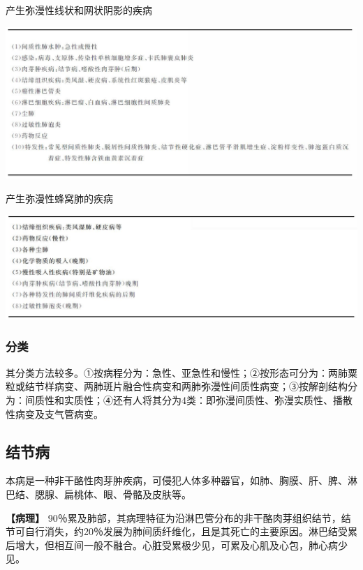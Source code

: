 \begin{table}[htbp]
\centering
\caption{产生弥漫性线状和网状阴影的疾病}
\label{tab9-10}
\includegraphics[width=\textwidth,height=\textheight,keepaspectratio]{./images/Image00233.jpg}
\end{table}

\begin{table}[htbp]
\centering
\caption{产生弥漫性蜂窝肺的疾病}
\label{tab9-11}
\includegraphics[width=\textwidth,height=\textheight,keepaspectratio]{./images/Image00234.jpg}
\end{table}

\subsubsection{分类}

其分类方法较多。①按病程分为：急性、亚急性和慢性；②按形态可分为：两肺粟粒或结节样病变、两肺斑片融合性病变和两肺弥漫性间质性病变；③按解剖结构分为：间质性和实质性；④还有人将其分为4类：即弥漫间质性、弥漫实质性、播散性病变及支气管病变。

\subsection{结节病}

本病是一种非干酪性肉芽肿疾病，可侵犯人体多种器官，如肺、胸膜、肝、脾、淋巴结、腮腺、扁桃体、眼、骨骼及皮肤等。

\textbf{【病理】}
90％累及肺部，其病理特征为沿淋巴管分布的非干酪肉芽组织结节，结节可自行消失，约20％发展为肺间质纤维化，且是其死亡的主要原因。淋巴结受累后增大，但相互间一般不融合。心脏受累极少见，可累及心肌及心包，肺心病少见。

